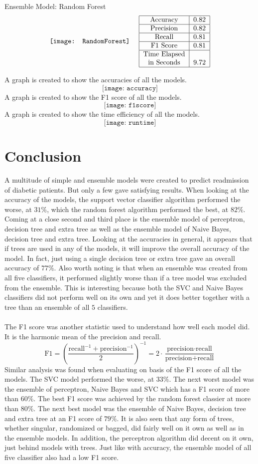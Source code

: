 \documentclass{article}
\newcommand{\scoring}[5]{\begin{tabular}{|c|c|} \hline 
Accuracy & #1 \\ \hline Precision & #1 \\ \hline 
Recall & #3 \\ \hline F1 Score & #4 \\ \hline Time Elapsed & \\ in Seconds & #5 \\ \hline \end{tabular}}
\begin{document}
Ensemble Model: Random Forest
$$ \texttt{[image: RandomForest]} ~~~~ \scoring{0.82}{0.82}{0.81}{0.81}{9.72} $$

A graph is created to show the accuracies of all the models. 
$$ \texttt{[image: accuracy]} $$ 
A graph is created to show the F1 score of all the models. 
$$ \texttt{[image: f1score]} $$ 
A graph is created to show the time efficiency of all the models. 
$$ \texttt{[image: runtime]} $$ 

\newpage
\section{Conclusion} 
A multitude of simple and ensemble models were created to predict readmission of diabetic patients. But only a few gave satisfying results. When looking at the accuracy of the models, the support vector classifier algorithm performed the worse, at $31\%$, which the random forest algorithm performed the best, at $82\%$. Coming at a close second and third place is the ensemble model of perceptron, decision tree and extra tree as well as the ensemble model of Naive Bayes, decision tree and extra tree. Looking at the accuracies in general, it appears that if trees are used in any of the models, it will improve the overall accuracy of the model. In fact, just using a single decision tree or extra tree gave an overall accuracy of $77\%$. Also worth noting is that when an ensemble was created from all five classifiers, it performed slightly worse than if a tree model was excluded from the ensemble. This is interesting because both the SVC and Naive Bayes classifiers did not perform well on its own and yet it does better together with a tree than an ensemble of all $5$ classifiers. \\~\\
The F1 score was another statistic used to understand how well each model did. It is the harmonic mean of the precision and recall. $$ \text{F1} = \left( \frac{ \text{recall}^{-1} + \text{precision}^{-1}}{2}\right)^{-1} =  2 \cdot \frac{\text{precision} \cdot \text{recall}}{\text{precision} + \text{recall}} $$ 
Similar analysis was found when evaluating on basis of the F1 score of all the models. The SVC model performed the worse, at $33\%$. The next worst model was the ensemble of perceptron, Naive Bayes and SVC which has a F1 score of more than $60\%$. The best F1 score was achieved by the random forest classier at more than $80\%$. The next best model was the ensemble of Naive Bayes, decision tree and extra tree at an F1 score of $79\%$. It is also seen that any form of trees, whether singular, randomized or bagged, did fairly well on it own as well as in the ensemble models. In addition, the perceptron algorithm did decent on it own, just behind models with trees. Just like with accuracy, the ensemble model of all five classifier also had a low F1 score. \\~\\
\end{document}
